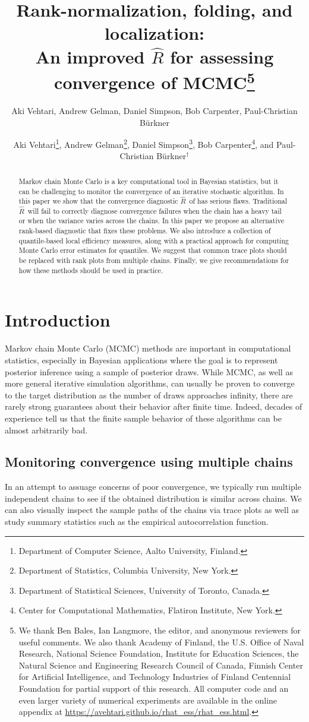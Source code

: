 \documentclass[american,]{article}
\title{Rank-normalization, folding, and localization:\\
  An improved $\widehat{R}$ for assessing convergence of MCMC\footnote{We thank Ben Bales, Ian Langmore, the editor, and anonymous reviewers for useful comments. We also thank Academy of Finland, the U.S. Office of Naval Research, National Science Foundation, Institute for Education Sciences, the Natural Science and Engineering Research Council of Canada, Finnish Center for Artificial Intelligence, and Technology Industries of Finland Centennial Foundation for partial support of this research.  All computer code and an 
even larger variety of numerical experiments are available in the online 
appendix at \url{https://avehtari.github.io/rhat_ess/rhat_ess.html}.}\vspace{.1in}}
\author{Aki Vehtari, Andrew Gelman, Daniel Simpson, Bob Carpenter, Paul-Christian Bürkner}
\author{
Aki Vehtari\footnote{Department of Computer Science, Aalto University, Finland.},
   Andrew Gelman\footnote{Department of Statistics, Columbia University, New York.},
 Daniel Simpson\footnote{Department of Statistical Sciences, University of Toronto, Canada.},
 Bob Carpenter\footnote{Center for Computational Mathematics, Flatiron Institute, New York.},
and Paul-Christian B\"{u}rkner$^\dagger$
}
\date{}
\newcommand{\Rhat}{$\widehat{R}$}
\theoremstyle{definition}
\begin{document}
\maketitle
\begin{abstract}
  Markov chain Monte Carlo is a key computational tool in Bayesian 
  statistics, but it can be challenging to monitor the convergence of an iterative stochastic algorithm.
In this paper we show that the convergence diagnostic \Rhat\ 
of \citet{Gelman+Rubin:1992} has serious flaws. Traditional \Rhat\ will fail to correctly diagnose
convergence failures when the chain has a heavy tail or when the variance varies across 
the chains. In this paper we propose an alternative rank-based diagnostic that fixes these 
problems. We also introduce
  a collection of quantile-based local efficiency
  measures, along with a practical approach for computing Monte Carlo error
  estimates for quantiles. We suggest that common trace plots should
  be replaced with rank plots from multiple chains. Finally, we give
  recommendations for how these methods should be used
  in practice.
\end{abstract}

\hypertarget{introduction}{%
\section{Introduction}\label{introduction}}

Markov chain Monte Carlo (MCMC) methods are important in computational statistics, especially 
in Bayesian applications where the goal is to represent
posterior inference using a sample of posterior draws. While MCMC, 
as well as more general iterative
simulation algorithms, can usually be proven to converge
to the target distribution as the number of draws approaches infinity,
there are rarely strong guarantees about their behavior after finite time. Indeed, decades of experience tell us that
the finite sample behavior of these algorithms can be almost arbitrarily bad.


\subsection{Monitoring convergence using multiple chains}


In an attempt to assuage concerns of poor convergence, we typically run multiple 
independent chains  to see if the obtained 
distribution is similar across chains.  We can also visually inspect
the sample paths of the chains via trace plots as well as study summary 
statistics such as the empirical autocorrelation function. 
\end{document}
